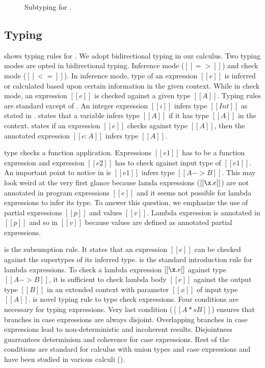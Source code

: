 \begin{figure}[t]
  \begin{small}
    \centering
  \end{small}
  \caption{Subtyping for \dut.}
  \label{fig:union:sub}
\end{figure}

\subsection{Typing}
\label{sec:union:typ}
 shows typing rules for \dut. We adopt bidirectional typing in our calculus.
Two typing modes are opted in bidirectional typing. Inference mode ($[[=>]]$) and check mode ($[[<=]]$).
In inference mode, type of an expression $[[e]]$ is inferred or calculated based upon certain information in
the given context. While in check mode, an expression $[[e]]$ is checked against a given type $[[A]]$.
Typing rules are standard except of .
An integer expression $[[i]]$ infers type $[[Int]]$ as stated in .
 states that a variable infers type $[[A]]$ if it has type $[[A]]$ in the context.
 states if an expression $[[e]]$ checks against type $[[A]]$, then the annotated expression
$[[e:A]]$ infers type $[[A]]$. 

 type checks a function application. Expressions $[[e1]]$
has to be a function expression and expression $[[e2]]$ has to check against input type of $[[e1]]$.
An important point to notice in  is $[[e1]]$ infers type $[[A -> B]]$. This may look weird
at the very first glance because lamda expressions ($[[\x.e]]$) are not annotated in program expressions 
$[[e]]$ and it seems not possible for lambda expressions to infer its type.
To answer this question, we emphasize the use of partial expressions $[[p]]$ and values $[[v]]$.
Lambda expression is annotated in $[[p]]$ and so in $[[v]]$ because values are defined as annotated
partial expressions. 

 is the subsumption rule. It states that an expression $[[e]]$ can be checked 
against the supertypes of its inferred type. 
 is the standard introduction rule for lambda expressions. To check a
lambda expression $[[\x.e]]$ against type $[[A -> B]]$, it is sufficient to check lambda body $[[e]]$
against the output type $[[B]]$ in an extended context with parameter $[[x]]$ of input type $[[A]]$.
 is novel typing rule to type check \typeof expressions. Four conditions are necessary
for typing \typeof expressions. Very last condition ($[[A *s B]]$) ensures that branches in case 
expressions are always disjoint. Overlapping branches in case expressions lead to non-deterministic
and incoherent results. Disjointness guarrantees determinism and coherence for case expressions.
Rest of the conditions are standard for calculus with union types and case expressions and have been
studied in various calculi ().

